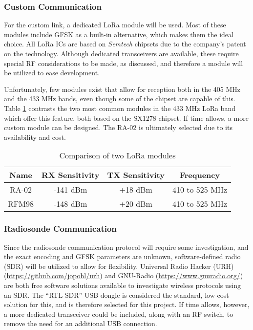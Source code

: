 \subsubsection{Custom Communication}
For the custom link, a dedicated LoRa module will be used. Most of these modules include GFSK as a built-in alternative, which makes them the ideal choice. All LoRa ICs are based on \textit{Semtech} chipsets due to the company's patent on the technology. Although dedicated transceivers are available, these require special RF considerations to be made, as discussed, and therefore a module will be utilized to ease development.

Unfortunately, few modules exist that allow for reception both in the 405 MHz and the 433 MHz bands, even though some of the chipset are capable of this. Table \ref{tab:rfModules} contrasts the two most common modules in the 433 MHz LoRa band which offer this feature, both based on the SX1278 chipset. If time allows, a more custom module can be designed. The RA-02 is ultimately selected due to its availability and cost.

\begin{table}[!htb]
  \centering
  \renewcommand{\arraystretch}{1.2}
  \begin{tabular}{ |c|c|c|c| }
  \hline
  \textbf{Name}   & \textbf{RX Sensitivity} & \textbf{TX Sensitivity}& \textbf{Frequency} \\
  \hline
  RA-02           & -141 dBm             & +18 dBm              & 410 to 525 MHz     \\
  RFM98           & -148 dBm             & +20 dBm              & 410 to 525 MHz     \\
  \hline
  \end{tabular}
  \caption{Comparison of two LoRa modules}
  \label{tab:rfModules}
\end{table}

\subsubsection{Radiosonde Communication}
Since the radiosonde communication protocol will require some investigation, and the exact encoding and GFSK parameters are unknown, software-defined radio (SDR) will be utilized to allow for flexibility. Universal Radio Hacker (URH) (\url{https://github.com/jopohl/urh}) and GNU-Radio (\url{https://www.gnuradio.org/}) are both free software solutions available to investigate wireless protocols using an SDR. The “RTL-SDR” USB dongle is considered the standard, low-cost solution for this, and is therefore selected for this project. If time allows, however, a more dedicated transceiver could be included, along with an RF switch, to remove the need for an additional USB connection.

